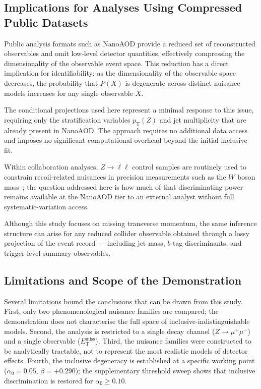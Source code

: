 \documentclass[a4paper,11pt]{article}
\newcommand{\MET}{\ensuremath{E_{\mathrm{T}}^{\mathrm{miss}}}\xspace}
\newcommand{\pTZ}{\ensuremath{p_{\mathrm{T}}(Z)}\xspace}
\newcommand{\zmumu}{\ensuremath{Z\!\to\!\mu^+\mu^-}\xspace}
\begin{document}
\subsection{Implications for Analyses Using Compressed Public Datasets}

Public analysis formats such as NanoAOD provide a reduced set of
reconstructed observables and omit low-level detector quantities,
effectively compressing the dimensionality of the observable event space.
This reduction has a direct implication for identifiability: as the
dimensionality of the observable space decreases, the probability that
$P(X)$ is degenerate across distinct nuisance models increases for any
single observable $X$.

The conditional projections used here represent a minimal response to this
issue, requiring only the stratification variables \pTZ and jet multiplicity
that are already present in NanoAOD.
The approach requires no additional data access and imposes no significant
computational overhead beyond the initial inclusive fit.

Within collaboration analyses, $Z\to\ell\ell$ control samples are routinely
used to constrain recoil-related nuisances in precision measurements such as
the $W$ boson mass~\cite{Kotwal:2024}; the question addressed here is how
much of that discriminating power remains available at the NanoAOD tier to
an external analyst without full systematic-variation access.

Although this study focuses on missing transverse momentum, the same
inference structure can arise for any reduced collider observable obtained
through a lossy projection of the event record --- including jet mass,
$b$-tag discriminants, and trigger-level summary observables.

\subsection{Limitations and Scope of the Demonstration}

Several limitations bound the conclusions that can be drawn from this study.
First, only two phenomenological nuisance families are compared; the
demonstration does not characterise the full space of
inclusive-indistinguishable models.
Second, the analysis is restricted to a single decay channel (\zmumu) and a
single observable (\MET).
Third, the nuisance families were constructed to be analytically tractable,
not to represent the most realistic models of detector effects.
Fourth, the inclusive degeneracy is established at a specific working point
($\alpha_0 = 0.05$, $\beta = +0.290$); the supplementary threshold sweep
shows that inclusive discrimination is restored for $\alpha_0 \geq 0.10$.
\end{document}
